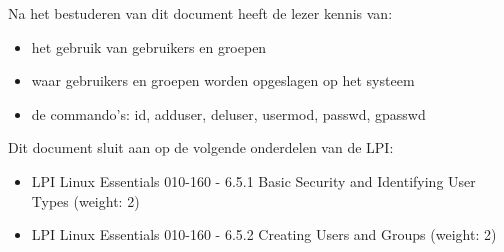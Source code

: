 Na het bestuderen van dit document heeft de lezer kennis van:
\begin{itemize}
\item het gebruik van gebruikers en groepen
\item waar gebruikers en groepen worden opgeslagen op het systeem
\item de commando's: id, adduser, deluser, usermod, passwd, gpasswd
\end{itemize}

Dit document sluit aan op de volgende onderdelen van de LPI:
\begin{itemize}
\item LPI Linux Essentials 010-160 - 6.5.1 Basic Security and Identifying User Types (weight: 2)
\item LPI Linux Essentials 010-160 - 6.5.2 Creating Users and Groups (weight: 2)
\end{itemize}


